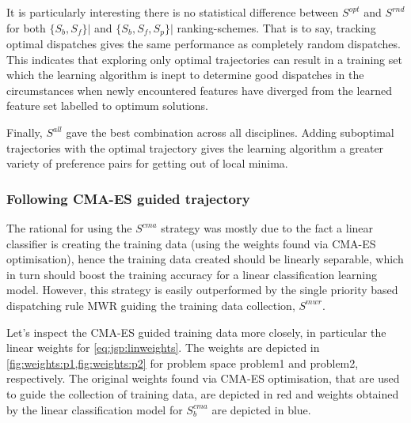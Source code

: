 It is particularly interesting there is no statistical difference between $S^{opt}$ and $S^{rnd}$ for both $\{S_{b},S_{f}\}\big|$ and $\{S_b,S_f,S_p\}\big|$ ranking-schemes. That is to say, tracking optimal dispatches gives the same performance as completely random dispatches. This indicates that exploring only optimal trajectories can result in a training set which the learning algorithm is inept to determine good dispatches in the circumstances when newly encountered features have diverged from the learned feature set labelled to optimum solutions. 

Finally, $S^{all}$ gave the best combination across all disciplines. Adding suboptimal trajectories with the optimal trajectory gives the learning algorithm a greater variety of preference pairs for getting out of local minima.

\subsubsection{Following CMA-ES guided trajectory}
The rational for using the $S^{cma}$ strategy was mostly due to the fact a linear classifier is creating the training data (using the weights found via CMA-ES optimisation), hence the training data created should be linearly separable, which in turn should boost the training accuracy for a linear classification learning model. However, this strategy is easily outperformed by the single priority based dispatching rule MWR guiding the training data collection, $S^{mwr}$. 

Let's inspect the CMA-ES guided training data more closely, in particular the linear weights for \cref{eq:jsp:linweights}. The weights are depicted in \cref{fig:weights:p1,fig:weights:p2} for problem space problem{1} and problem{2}, respectively. The original weights found via CMA-ES optimisation, that are used to guide the collection of training data, are depicted in red and  weights obtained by the linear classification model for $S_b^{cma}$ are depicted in blue.


